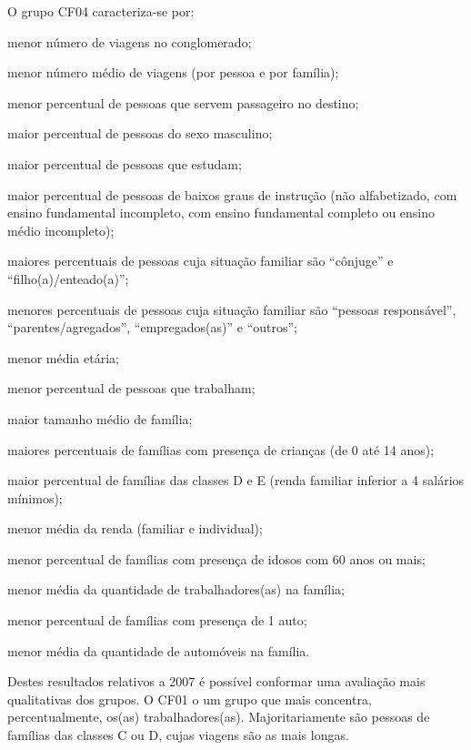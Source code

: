 O grupo CF04 caracteriza-se por:
\begin{compactitem}
\item menor número de viagens no conglomerado;
\item menor número médio de viagens (por pessoa e por família);
\item menor percentual de pessoas que servem passageiro no destino;

\item maior percentual de pessoas do sexo masculino;
\item maior percentual de pessoas que estudam;
\item maior percentual de pessoas de baixos graus de instrução (não alfabetizado, com ensino fundamental incompleto, com ensino fundamental completo ou ensino médio incompleto);
\item maiores percentuais de pessoas cuja situação familiar são ``cônjuge'' e ``filho(a)/enteado(a)'';
\item menores percentuais de pessoas cuja situação familiar são ``pessoas responsável'', ``parentes/agregados'', ``empregados(as)'' e ``outros'';
\item menor média etária;
\item menor percentual de pessoas que trabalham;

\item maior tamanho médio de família;
\item maiores percentuais de famílias com presença de crianças (de 0 até 14 anos);
\item maior percentual de famílias das classes D e E (renda familiar inferior a 4 salários mínimos);
\item menor média da renda (familiar e individual);
\item menor percentual de famílias com presença de idosos com 60 anos ou mais;
\item menor média da quantidade de trabalhadores(as) na família;
\item menor percentual de famílias com presença de 1 auto;
\item menor média da quantidade de automóveis na família.
\end{compactitem}

Destes resultados relativos a 2007 é possível conformar uma avaliação mais qualitativas dos grupos.
O CF01 o um grupo que mais concentra, percentualmente, os(as) trabalhadores(as). 
Majoritariamente são pessoas de famílias das classes C ou D, cujas viagens são as mais longas.

